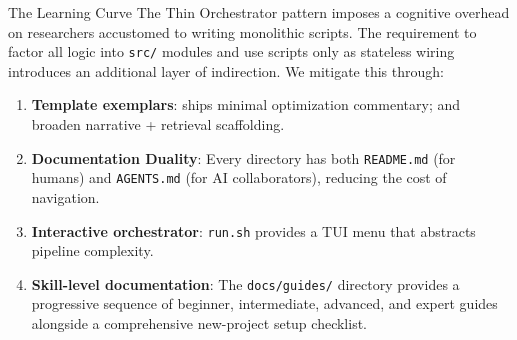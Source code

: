 \documentclass[
  ignorenonframetext,
]{beamer}
\providecommand{\tightlist}{%
  \setlength{\itemsep}{0pt}\setlength{\parskip}{0pt}}
\begin{document}
\begin{frame}{The Learning Curve}
\protect{}\label{the-learning-curve}
The Thin Orchestrator pattern imposes a cognitive overhead on
researchers accustomed to writing monolithic scripts. The requirement to
factor all logic into \texttt{src/} modules and use scripts only as
stateless wiring introduces an additional layer of indirection. We
mitigate this through:

\begin{enumerate}
\tightlist
\item
  \textbf{Template exemplars}:  ships
  minimal optimization commentary;  and
   broaden narrative + retrieval
  scaffolding.
\item
  \textbf{Documentation Duality}: Every directory has both
  \texttt{README.md} (for humans) and \texttt{AGENTS.md} (for AI
  collaborators), reducing the cost of navigation.
\item
  \textbf{Interactive orchestrator}: \texttt{run.sh} provides a TUI menu
  that abstracts pipeline complexity.
\item
  \textbf{Skill-level documentation}: The \texttt{docs/guides/}
  directory provides a progressive sequence of beginner, intermediate,
  advanced, and expert guides alongside a comprehensive new-project
  setup checklist.
\end{enumerate}
\end{frame}
\end{document}
